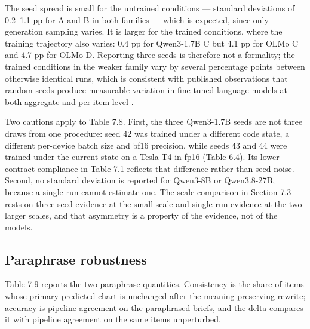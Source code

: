 The seed spread is small for the untrained conditions --- standard deviations of 0.2--1.1 pp for A and B in both families --- which is expected, since only generation sampling varies. It is larger for the trained conditions, where the training trajectory also varies: 0.4 pp for Qwen3-1.7B C but 4.1 pp for OLMo C and 4.7 pp for OLMo D. Reporting three seeds is therefore not a formality; the trained conditions in the weaker family vary by several percentage points between otherwise identical runs, which is consistent with published observations that random seeds produce measurable variation in fine-tuned language models at both aggregate and per-item level \cite{bui2025seeds}.

Two cautions apply to Table 7.8. First, the three Qwen3-1.7B seeds are not three draws from one procedure: seed 42 was trained under a different code state, a different per-device batch size and bf16 precision, while seeds 43 and 44 were trained under the current state on a Tesla T4 in fp16 (Table 6.4). Its lower contract compliance in Table 7.1 reflects that difference rather than seed noise. Second, no standard deviation is reported for Qwen3-8B or Qwen3.8-27B, because a single run cannot estimate one. The scale comparison in Section 7.3 rests on three-seed evidence at the small scale and single-run evidence at the two larger scales, and that asymmetry is a property of the evidence, not of the models.

\subsection{Paraphrase robustness}

Table 7.9 reports the two paraphrase quantities. Consistency is the share of items whose primary predicted chart is unchanged after the meaning-preserving rewrite; accuracy is pipeline agreement on the paraphrased briefs, and the delta compares it with pipeline agreement on the same items unperturbed.

